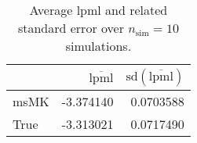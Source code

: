 \begin{table}[H]

\caption{Average lpml and related standard error over $n_{\text{sim}} = 10$ simulations.}
\centering
\begin{tabular}[t]{lrr}
\toprule
  & $\overbar{\text{lpml}}$ & $\text{sd}(\overbar{\text{lpml}})$\\
\midrule
msMK & -3.374140 & 0.0703588\\
True & -3.313021 & 0.0717490\\
\bottomrule
\end{tabular}
\end{table}